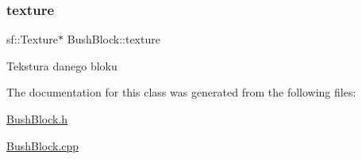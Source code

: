 \subsubsection{\texorpdfstring{texture}{texture}}
{\footnotesize\ttfamily sf\+::\+Texture$\ast$ Bush\+Block\+::texture\hspace{0.3cm}{\ttfamily [protected]}}

Tekstura danego bloku 

The documentation for this class was generated from the following files\+:\begin{DoxyCompactItemize}
\item 
\hyperlink{_bush_block_8h}{Bush\+Block.\+h}\item 
\hyperlink{_bush_block_8cpp}{Bush\+Block.\+cpp}\end{DoxyCompactItemize}

